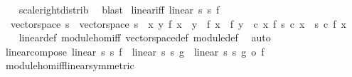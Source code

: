 \begin{isabellebody}
\ \ \isamarkupfalse%
\ scale{\isacharunderscore}{\kern0pt}right{\isacharunderscore}{\kern0pt}distrib\ \isamarkupfalse%
\ blast%
\endisatagproof
{\isafoldproof}%
%
\isadelimproof
\isanewline
%
\endisadelimproof
\isanewline
{}\isamarkupfalse%
\isanewline
\isanewline
{}\isamarkupfalse%
\ linear{\isacharunderscore}{\kern0pt}iff{\isacharcolon}{\kern0pt}\ {\isachardoublequoteopen}linear\ s{}\ s{}\ f\ {\isasymlongleftrightarrow}\isanewline
\ \ {\isacharparenleft}{\kern0pt}vector{\isacharunderscore}{\kern0pt}space\ s{}\ {\isasymand}\ vector{\isacharunderscore}{\kern0pt}space\ s{}\ {\isasymand}\ {\isacharparenleft}{\kern0pt}{\isasymforall}x\ y{\isachardot}{\kern0pt}\ f\ {\isacharparenleft}{\kern0pt}x\ {\isacharplus}{\kern0pt}\ y{\isacharparenright}{\kern0pt}\ {\isacharequal}{\kern0pt}\ f\ x\ {\isacharplus}{\kern0pt}\ f\ y{\isacharparenright}{\kern0pt}\ {\isasymand}\ {\isacharparenleft}{\kern0pt}{\isasymforall}c\ x{\isachardot}{\kern0pt}\ f\ {\isacharparenleft}{\kern0pt}s{}\ c\ x{\isacharparenright}{\kern0pt}\ {\isacharequal}{\kern0pt}\ s{}\ c\ {\isacharparenleft}{\kern0pt}f\ x{\isacharparenright}{\kern0pt}{\isacharparenright}{\kern0pt}{\isacharparenright}{\kern0pt}{\isachardoublequoteclose}\isanewline
%
\isadelimproof
\ \ %
\endisadelimproof
%
\isatagproof
{}\isamarkupfalse%
\ linear{\isacharunderscore}{\kern0pt}def\ module{\isacharunderscore}{\kern0pt}hom{\isacharunderscore}{\kern0pt}iff\ vector{\isacharunderscore}{\kern0pt}space{\isacharunderscore}{\kern0pt}def\ module{\isacharunderscore}{\kern0pt}def\ \isamarkupfalse%
\ auto%
\endisatagproof
{\isafoldproof}%
%
\isadelimproof
\isanewline
%
\endisadelimproof
\isanewline
{}\isamarkupfalse%
\ \isanewline
{}\ \isamarkupfalse%
\ linear{\isacharunderscore}{\kern0pt}compose{\isacharcolon}{\kern0pt}\ {\isachardoublequoteopen}linear\ s{}\ s{}\ f\ {\isasymLongrightarrow}\ linear\ s{}\ s{}\ g\ {\isasymLongrightarrow}\ linear\ s{}\ s{}\ {\isacharparenleft}{\kern0pt}g\ o\ f{\isacharparenright}{\kern0pt}{\isachardoublequoteclose}\isanewline
%
\isadelimproof
\ \ %
\endisadelimproof
%
\isatagproof
{}\isamarkupfalse%
\ module{\isacharunderscore}{\kern0pt}hom{\isacharunderscore}{\kern0pt}iff{\isacharunderscore}{\kern0pt}linear{\isacharbrackleft}{\kern0pt}symmetric{\isacharbrackright}{\kern0pt}\isanewline

\end{isabellebody}
